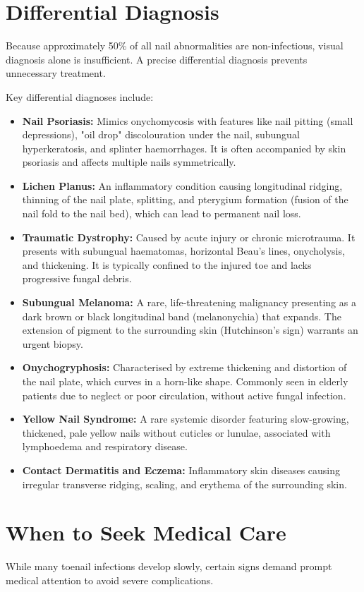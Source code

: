 \section*{Differential Diagnosis}
Because approximately 50\% of all nail abnormalities are non-infectious, visual diagnosis alone is insufficient. A precise differential diagnosis prevents unnecessary treatment.

Key differential diagnoses include:
\begin{itemize}
    \item \textbf{Nail Psoriasis:} Mimics onychomycosis with features like nail pitting (small depressions), "oil drop" discolouration under the nail, subungual hyperkeratosis, and splinter haemorrhages. It is often accompanied by skin psoriasis and affects multiple nails symmetrically.
    \item \textbf{Lichen Planus:} An inflammatory condition causing longitudinal ridging, thinning of the nail plate, splitting, and pterygium formation (fusion of the nail fold to the nail bed), which can lead to permanent nail loss.
    \item \textbf{Traumatic Dystrophy:} Caused by acute injury or chronic microtrauma. It presents with subungual haematomas, horizontal Beau's lines, onycholysis, and thickening. It is typically confined to the injured toe and lacks progressive fungal debris.
    \item \textbf{Subungual Melanoma:} A rare, life-threatening malignancy presenting as a dark brown or black longitudinal band (melanonychia) that expands. The extension of pigment to the surrounding skin (Hutchinson's sign) warrants an urgent biopsy.
    \item \textbf{Onychogryphosis:} Characterised by extreme thickening and distortion of the nail plate, which curves in a horn-like shape. Commonly seen in elderly patients due to neglect or poor circulation, without active fungal infection.
    \item \textbf{Yellow Nail Syndrome:} A rare systemic disorder featuring slow-growing, thickened, pale yellow nails without cuticles or lunulae, associated with lymphoedema and respiratory disease.
    \item \textbf{Contact Dermatitis and Eczema:} Inflammatory skin diseases causing irregular transverse ridging, scaling, and erythema of the surrounding skin.
\end{itemize}

\section*{When to Seek Medical Care}
While many toenail infections develop slowly, certain signs demand prompt medical attention to avoid severe complications.


